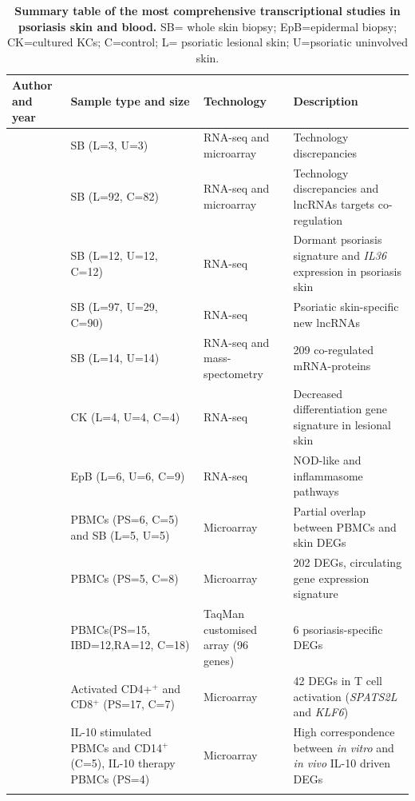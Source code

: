 \begin{landscape}
\begin{center}
\begin{longtable}[ht]{p{.25\textheight} p{.40\textheight} p{.25\textheight} p{.60\textheight}}
\caption[Summary table of the most comprehensive transcriptional studies in psoriasis skin and blood.]{\textbf{Summary table of the most comprehensive transcriptional studies in psoriasis skin and blood.} SB= whole skin biopsy; EpB=epidermal biopsy; CK=cultured KCs; C=control; L= psoriatic lesional skin; U=psoriatic uninvolved skin.}
\label{tab:Skin_and_blood_transcriptomics} \\
\toprule
\textbf{Author and year} & \textbf{Sample type and size} & \textbf{Technology} & \textbf{Description}\\
\midrule
\midrule
\parencite{Jabbari2011}	   & SB (L=3, U=3)         & RNA-seq and microarray & Technology discrepancies     \\
\parencite{Li2014}	       & SB (L=92, C=82)       & RNA-seq and microarray & Technology discrepancies and lncRNAs targets co-regulation\\
\parencite{Keermann2015}	 & SB (L=12, U=12, C=12) & RNA-seq                & Dormant psoriasis signature and \textit{IL36} expression in psoriasis skin \\
\parencite{Tsoi2015}	     & SB (L=97, U=29, C=90) & RNA-seq                & Psoriatic skin-specific new lncRNAs\\
\parencite{Swindell2015}   & SB (L=14, U=14)       & RNA-seq and mass-spectometry & 209 co-regulated mRNA-proteins \\
\parencite{Swindell2017}	 & CK (L=4, U=4, C=4)    & RNA-seq                & Decreased differentiation gene signature in lesional skin\\
\parencite{Tervaniemi2016} & EpB (L=6, U=6, C=9)   & RNA-seq                & NOD-like and inflammasome pathways\\
\parencite{Coda2012}   & PBMCs (PS=6, C=5) and SB (L=5, U=5)   & Microarray             & Partial overlap between PBMCs and skin DEGs\\
\parencite{Lee2009}	   & PBMCs (PS=5, C=8)	      & Microarray             & 202 DEGs, circulating gene expression signature \\
\parencite{Mesko2015}  & PBMCs(PS=15, IBD=12,RA=12, C=18)      &  TaqMan customised array (96 genes)     & 6 psoriasis-specific DEGs \\
\parencite{Palau2013}	 & Activated CD4+$^+$ and CD8$^+$  (PS=17, C=7) & Microarray  & 42 DEGs in T cell activation (\textit{SPATS2L} and \textit{KLF6})\\
\parencite{Jung2004}  & IL-10 stimulated PBMCs and CD14$^+$ (C=5), IL-10 therapy PBMCs (PS=4) & Microarray  & High correspondence between \textit{in vitro} and \textit{in vivo} IL-10 driven DEGs \\
\bottomrule
\medskip
\end{longtable}
\end{center}
\end{landscape}

